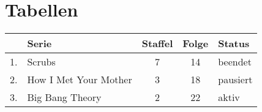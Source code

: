 \section{Tabellen}

\begin{tabular}{|c l|c|c|l|}
	\hline 
	& Serie & Staffel & Folge & Status \\ 
	\hline
	\hline 
	1. & Scrubs & 7 & 14 & beendet \\ 
	\hline 
	2. & How I Met Your Mother & 3 & 18 & pausiert \\ 
	\hline 
	3. & Big Bang Theory & 2 & 22 & aktiv \\ 
	\hline 
\end{tabular}

